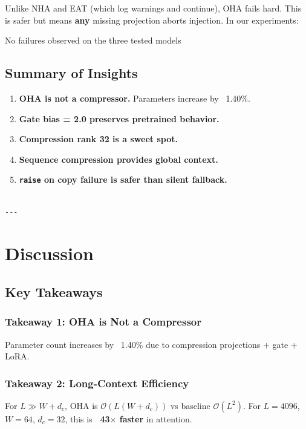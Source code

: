 Unlike NHA and EAT (which log warnings and continue), OHA fails hard. This 
is safer but means \textbf{any} missing projection aborts injection. In our 
experiments:

No failures observed on the three tested models

\subsection{Summary of Insights}

\begin{enumerate}
\item \textbf{OHA is not a compressor.} Parameters increase by ~1.40\%.
\item \textbf{Gate bias = 2.0 preserves pretrained behavior.}
\item \textbf{Compression rank 32 is a sweet spot.}
\item \textbf{Sequence compression provides global context.}
\item \textbf{\texttt{raise} on copy failure is safer than silent fallback.}
\end{enumerate}
\begin{lstlisting}

---
\end{lstlisting}


\section{Discussion}

\subsection{Key Takeaways}

\subsubsection{Takeaway 1: OHA is Not a Compressor}

Parameter count increases by ~1.40\% due to compression 
projections + gate + LoRA.

\subsubsection{Takeaway 2: Long-Context Efficiency}

For $L \gg W + d_c$, OHA is $\mathcal{O}(L(W + d_c))$ vs baseline 
$\mathcal{O}(L^2)$. For $L = 4096$, $W = 64$, $d_c = 32$, this is 
\textbf{~43$\times$ faster} in attention.

